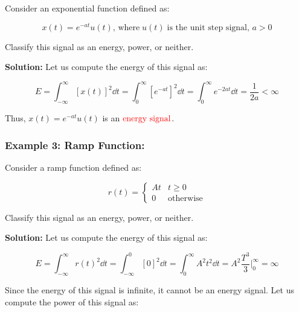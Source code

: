 \documentclass[
  12pt,
  a4paper,
]{report}
\begin{document}
Consider an exponential function defined as:

\begin{equation}     
\label{eq:exponential-function-example}
    x(t) = e^{-at}u(t), \, \text{where} \; u(t) \;\text{is the unit step signal},\, a > 0 
\end{equation}

Classify this signal as an energy, power, or neither.

\textbf{Solution:} Let us compute the energy of this signal as:

\begin{equation}     
\label{eq:exp-function-energy}     
E = \int_{-\infty}^{\infty} {[x(t)]}^2  \dd{t} = \int_{0}^{\infty} {[e^{-at}]}^2 \dd{t} = \int_{0}^{\infty} e^{-2at} \dd{t} = \frac{1}{2a} < \infty 
\end{equation}

Thus, \(x(t) = e^{-at} u(t)\) is an
\(\textcolor{red}{\text{energy signal}}\).

\subsubsection{Example 3: Ramp Function:}\label{example-3-ramp-function}

Consider a ramp function defined as:

\begin{equation}     
\label{eq:ramp-function-example}     
r(t) = 
    \begin{cases}         
        At & t \geq 0         \\         
        0  & \text{otherwise}     
    \end{cases} 
\end{equation}

Classify this signal as an energy, power, or neither.

\textbf{Solution:} Let us compute the energy of this signal as:

\begin{equation}     
\label{eq:ramp-function-energy}     
E = \int_{-\infty}^{\infty} {r(t)}^2 \dd{t} = \int_{-\infty}^{0} {[0]}^2 \dd{t} = \int_{0}^{\infty} A^2 t^2 \dd{t} = A^2 \frac{T^3}{3} \Bigg|_{0}^{\infty} = \infty 
\end{equation}

Since the energy of this signal is infinite, it cannot be an energy
signal. Let us compute the power of this signal as:
\end{document}
